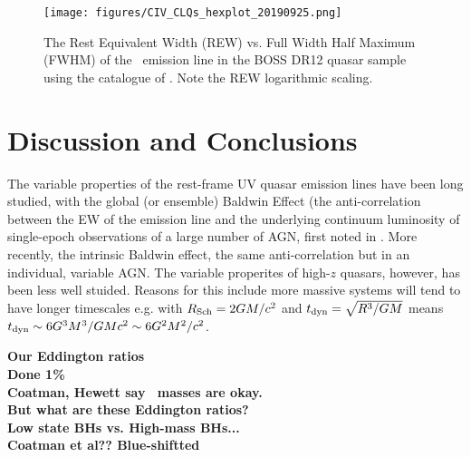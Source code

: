 \documentclass[a4paper,fleqn,usenatbib]{mnras}
\begin{document}
\begin{figure}
  \centering
  \texttt{[image: figures/CIV\_CLQs\_hexplot\_20190925.png]}
   \vspace{-12pt}
  \caption[]{The Rest Equivalent Width (REW) vs. Full Width Half Maximum (FWHM) 
of the \civ\ emission line in the BOSS DR12 quasar sample using the catalogue 
of \citet{Hamann2017}. Note the REW logarithmic scaling.}
  \label{fig:REWvsFWHM}
\end{figure}

\section{Discussion and Conclusions}
The variable properties of the rest-frame UV quasar emission lines
have been long studied, with the global (or ensemble) Baldwin Effect
(the anti-correlation between the EW of the emission line and the
underlying continuum luminosity of single-epoch observations of a
large number of AGN, first noted in \citet{Baldwin1977}. 
More recently, the intrinsic Baldwin effect, the same anti-correlation but in an individual, variable AGN.
%
The variable properites of high-$z$ quasars, however, has been less 
well stuided. Reasons for this include more massive systems will tend to 
have longer timescales e.g. with $R_{\rm Sch}= 2GM /c^{2}$ and $t_{\rm dyn} =\sqrt{ R^{3}/GM}$
means   $t_{\rm dyn} \sim 6G^{3} M^{3} / GM c^{2} \sim 6G^{2} M^{2} / c^{2} $.

\noindent
{\bf Our Eddington ratios \\
Done 1\% \\
Coatman, Hewett say \civ\ masses are okay.\\
But what are these Eddington ratios? \\
Low state BHs vs. High-mass BHs... \\
Coatman et al?? Blue-shiftted \\
}
\end{document}
